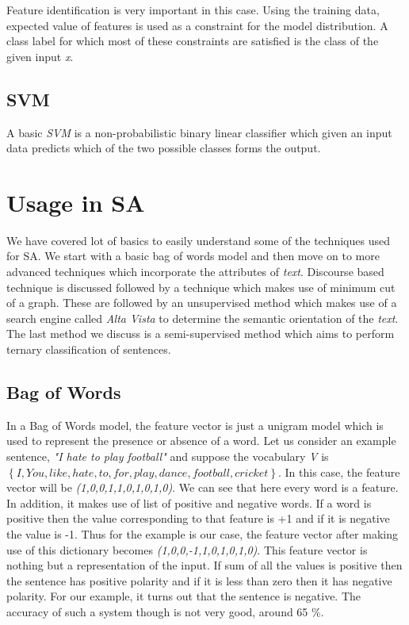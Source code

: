 Feature identification is very important in this case. Using the training data, expected value of features is used as a constraint
for the model distribution. A class label for which most of these constraints are satisfied is the class of the given input \textit{x}.

\subsection{SVM}
A basic \textit{SVM} is a non-probabilistic binary linear classifier which given an input data predicts which of the two possible classes
forms the output.

\section{Usage in SA}

We have covered lot of basics to easily understand some of the techniques used for SA. We start with a basic bag of words model 
and then move on to more advanced techniques which incorporate the attributes of \textit{text}. Discourse based technique is 
discussed followed by a technique which makes use of minimum cut of a graph. These are followed by an unsupervised method which
makes use of a search engine called \textit{Alta Vista} to determine the semantic orientation of the \textit{text}. The last method
we discuss is a semi-supervised method which aims to perform ternary classification of sentences. 

\subsection{Bag of Words}

In a Bag of Words model, the feature vector is just a unigram model which is used to represent the presence or absence of a word.
Let us consider an example sentence, \textit{"I hate to play football"} and suppose the vocabulary \textit{V} is \(\left\{I, You, like, 
hate, to, for, play, dance, football, cricket\right\}\). In this case,  the feature vector will be \textit{(1,0,0,1,1,0,1,0,1,0)}.
We can see that here every word is a feature. In addition, it makes use of list of positive and negative words. If a word is positive
then the value corresponding to that feature is +1 and if it is negative the value is -1. Thus for the example is our case, the 
feature vector after making use of this dictionary becomes \textit{(1,0,0,-1,1,0,1,0,1,0)}. This feature vector is nothing but
a representation of the input. If sum of all the values is positive then the sentence has positive polarity and if it is less than
zero then it has negative polarity. For our example, it turns out that the sentence is negative. The accuracy of such a system though 
is not very good, around 65 \%.

